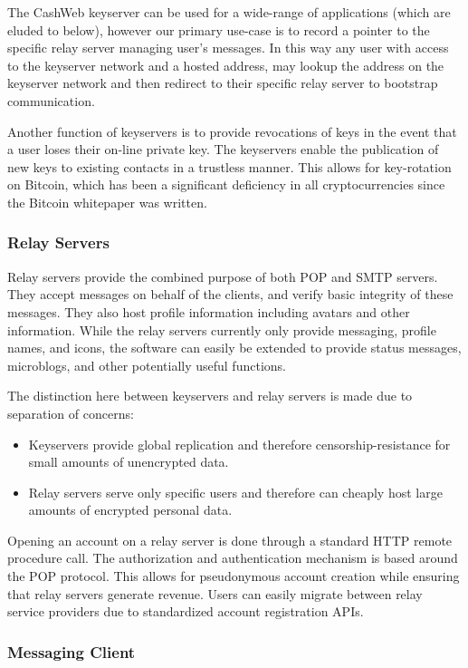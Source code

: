 \documentclass{article}
\begin{document}
The CashWeb keyserver can be used for a wide-range of applications (which are eluded to below), however our primary use-case is to record a pointer to the specific relay server managing user's messages. In this way any user with access to the keyserver network and a hosted address, may lookup the address on the keyserver network and then redirect to their specific relay server to bootstrap communication. 

Another function of keyservers is to provide revocations of keys in the event that a user loses their on-line private key. The keyservers enable the publication of new keys to existing contacts in a trustless manner. This allows for key-rotation on Bitcoin, which has been a significant deficiency in all cryptocurrencies since the Bitcoin whitepaper was written.

\subsubsection{Relay Servers}

Relay servers provide the combined purpose of both POP and SMTP servers. They accept messages on behalf of the clients, and verify basic integrity of these messages. They also host profile information including avatars and other information. While the relay servers currently only provide messaging, profile names, and icons, the software can easily be extended to provide status messages, microblogs, and other potentially useful functions.

The distinction here between keyservers and relay servers is made due to separation of concerns:
\begin{itemize}
  \item Keyservers provide global replication and therefore censorship-resistance for small amounts of unencrypted data.
  \item Relay servers serve only specific users and therefore can cheaply host large amounts of encrypted personal data.
\end{itemize}

Opening an account on a relay server is done through a standard HTTP remote procedure call. The authorization and authentication mechanism is based around the POP protocol. This allows for pseudonymous account creation while ensuring that relay servers generate revenue. Users can easily migrate between relay service providers due to standardized account registration APIs.

\subsubsection{Messaging Client}
\end{document}
